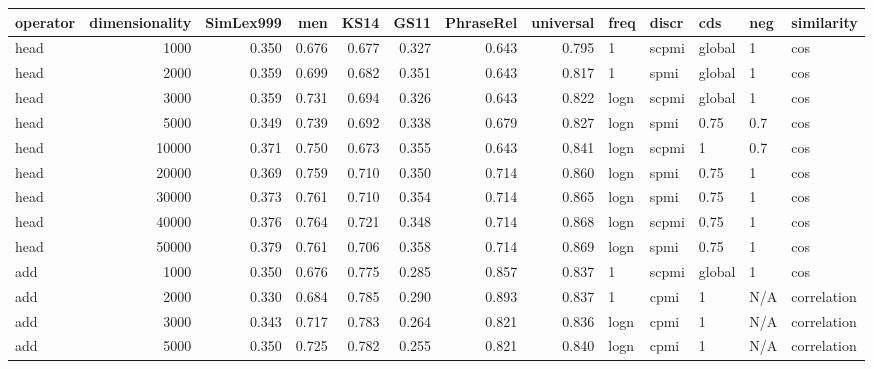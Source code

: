 \begin{tabular}{lrrrrrrrlllll}
\toprule
operator &  dimensionality &  SimLex999 &    men &   KS14 &   GS11 &  PhraseRel &  universal &  freq &  discr &     cds &  neg &     similarity \\
\midrule
    head &            1000 &      0.350 &  0.676 &  0.677 &  0.327 &      0.643 &      0.795 &     1 &  scpmi &  global &    1 &            cos \\
    head &            2000 &      0.359 &  0.699 &  0.682 &  0.351 &      0.643 &      0.817 &     1 &   spmi &  global &    1 &            cos \\
    head &            3000 &      0.359 &  0.731 &  0.694 &  0.326 &      0.643 &      0.822 &  logn &  scpmi &  global &    1 &            cos \\
    head &            5000 &      0.349 &  0.739 &  0.692 &  0.338 &      0.679 &      0.827 &  logn &   spmi &    0.75 &  0.7 &            cos \\
    head &           10000 &      0.371 &  0.750 &  0.673 &  0.355 &      0.643 &      0.841 &  logn &  scpmi &       1 &  0.7 &            cos \\
    head &           20000 &      0.369 &  0.759 &  0.710 &  0.350 &      0.714 &      0.860 &  logn &   spmi &    0.75 &    1 &            cos \\
    head &           30000 &      0.373 &  0.761 &  0.710 &  0.354 &      0.714 &      0.865 &  logn &   spmi &    0.75 &    1 &            cos \\
    head &           40000 &      0.376 &  0.764 &  0.721 &  0.348 &      0.714 &      0.868 &  logn &  scpmi &    0.75 &    1 &            cos \\
    head &           50000 &      0.379 &  0.761 &  0.706 &  0.358 &      0.714 &      0.869 &  logn &   spmi &    0.75 &    1 &            cos \\
     add &            1000 &      0.350 &  0.676 &  0.775 &  0.285 &      0.857 &      0.837 &     1 &  scpmi &  global &    1 &            cos \\
     add &            2000 &      0.330 &  0.684 &  0.785 &  0.290 &      0.893 &      0.837 &     1 &   cpmi &       1 &  N/A &    correlation \\
     add &            3000 &      0.343 &  0.717 &  0.783 &  0.264 &      0.821 &      0.836 &  logn &   cpmi &       1 &  N/A &    correlation \\
     add &            5000 &      0.350 &  0.725 &  0.782 &  0.255 &      0.821 &      0.840 &  logn &   cpmi &       1 &  N/A &    correlation \\

\end{tabular}
